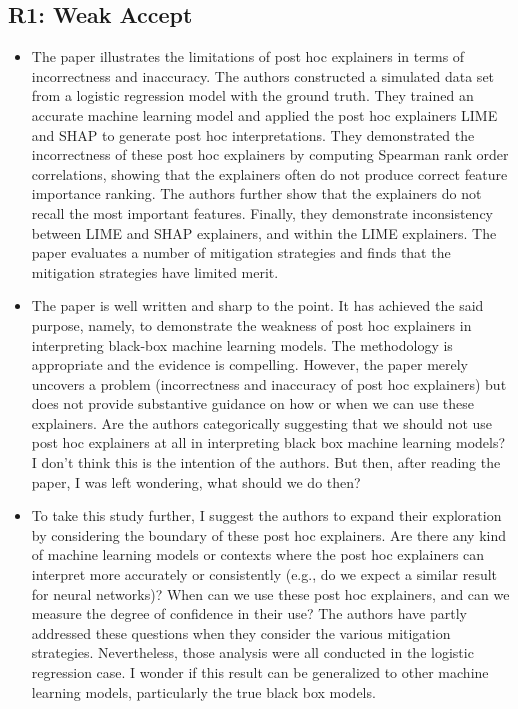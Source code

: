 \documentclass{article} %
\begin{document}
\subsection{R1: Weak Accept}
\begin{itemize}
\item The paper illustrates the limitations of post hoc explainers in terms of incorrectness and inaccuracy. The authors constructed a simulated data set from a logistic regression model with the ground truth. They trained an accurate machine learning model and applied the post hoc explainers LIME and SHAP to generate post hoc interpretations. They demonstrated the incorrectness of these post hoc explainers by computing Spearman rank order correlations, showing that the explainers often do not produce correct feature importance ranking. The authors further show that the explainers do not recall the most important features. Finally, they demonstrate inconsistency between LIME and SHAP explainers, and within the LIME explainers. The paper evaluates a number of mitigation strategies and finds that the mitigation strategies have limited merit.
\item The paper is well written and sharp to the point. It has achieved the said purpose, namely, to demonstrate the weakness of post hoc explainers in interpreting black-box machine learning models. The methodology is appropriate and the evidence is compelling. However, the paper merely uncovers a problem (incorrectness and inaccuracy of post hoc explainers) but does not provide substantive guidance on how or when we can use these explainers. Are the authors categorically suggesting that we should not use post hoc explainers at all in interpreting black box machine learning models? I don't think this is the intention of the authors. But then, after reading the paper, I was left wondering, what should we do then?
\item To take this study further, I suggest the authors to expand their exploration by considering the boundary of these post hoc explainers. Are there any kind of machine learning models or contexts where the post hoc explainers can interpret more accurately or consistently (e.g., do we expect a similar result for neural networks)? When can we use these post hoc explainers, and can we measure the degree of confidence in their use? The authors have partly addressed these questions when they consider the various mitigation strategies. Nevertheless, those analysis were all conducted in the logistic regression case. I wonder if this result can be generalized to other machine learning models, particularly the true black box models.
\end{itemize}
\end{document}
